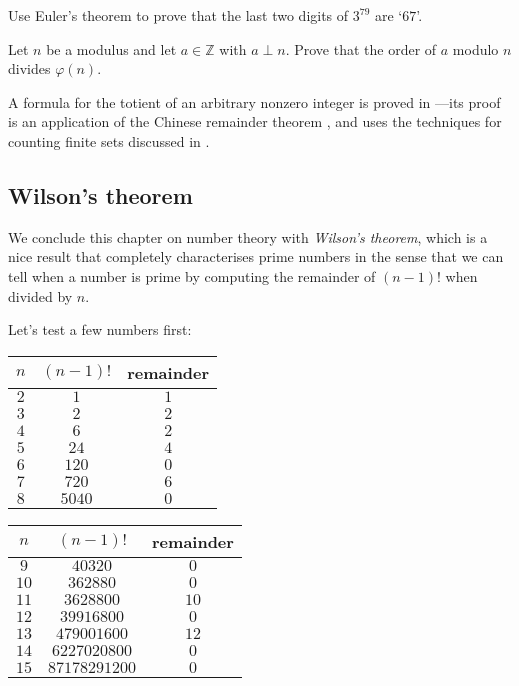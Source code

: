 \begin{exercise}
Use Euler's theorem to prove that the last two digits of $3^{79}$ are `$67$'.
\end{exercise}

\begin{example}
Let $n$ be a modulus and let $a \in \mathbb{Z}$ with $a \perp n$. Prove that the order of $a$ modulo $n$ divides $\varphi(n)$.
\end{example}

A formula for the totient of an arbitrary nonzero integer is proved in ---its proof is an application of the Chinese remainder theorem , and uses the techniques for counting finite sets discussed in .

\subsection*{Wilson's theorem}

We conclude this chapter on number theory with \textit{Wilson's theorem}, which is a nice result that completely characterises prime numbers in the sense that we can tell when a number is prime by computing the remainder of $(n-1)!$ when divided by $n$.

Let's test a few numbers first:

\begin{center}
\begin{tabular}{c|c|c}
$n$ & $(n-1)!$ & remainder \\ \hline
$2$ & $1$ & $1$ \\
$3$ & $2$ & $2$ \\
$4$ & $6$ & $2$ \\
$5$ & $24$ & $4$ \\
$6$ & $120$ & $0$ \\ 
$7$ & $720$ & $6$ \\
$8$ & $5040$ & $0$
\end{tabular}

\begin{tabular}{c|c|c}
$n$ & $(n-1)!$ & remainder \\ \hline
$9$ & $40320$ & $0$ \\
$10$ & $362880$ & $0$ \\
$11$ & $3628800$ & $10$ \\
$12$ & $39916800$ & $0$ \\
$13$ & $479001600$ & $12$ \\
$14$ & $6227020800$ & $0$ \\
$15$ & $87178291200$ & $0$
\end{tabular}
\end{center}


